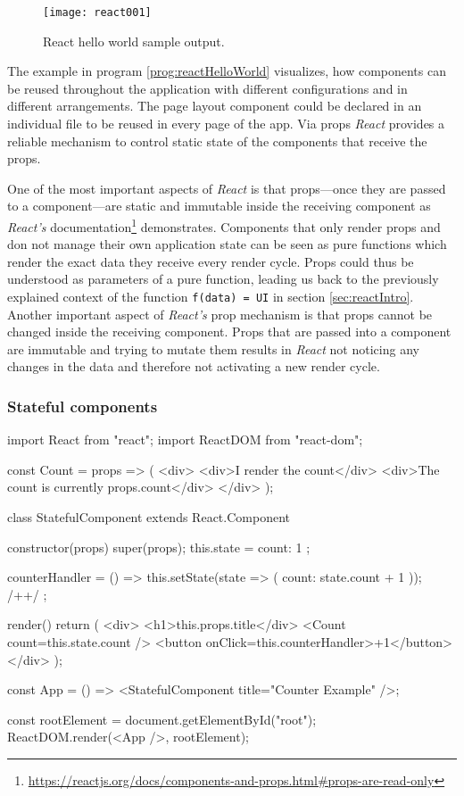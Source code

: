 \begin{figure}
  \centering
  \texttt{[image: react001]}
  \caption{React hello world sample output.}
  \label{fig:reactHelloWorld}
\end{figure}

The example in program \ref{prog:reactHelloWorld} visualizes, how components can be reused throughout the application with different configurations and in different arrangements. The page layout component could be declared in an individual file to be reused in every page of the app. Via props \emph{React} provides a reliable mechanism to control static state of the components that receive the props.

One of the most important aspects of \emph{React} is that props---once they are passed to a component---are static and immutable inside the receiving component as \emph{React's} documentation\footnote{\url{https://reactjs.org/docs/components-and-props.html\#props-are-read-only}} demonstrates. Components that only render props and don not manage their own application state can be seen as pure functions which render the exact data they receive every render cycle. Props could thus be understood as parameters of a pure function, leading us back to the previously explained context of the function \texttt{f(data) = UI} in section \ref{sec:reactIntro}. Another important aspect of \emph{React's} prop mechanism is that props cannot be changed inside the receiving component. Props that are passed into a component are immutable and trying to mutate them results in \emph{React} not noticing any changes in the data and therefore not activating a new render cycle.

\subsubsection{Stateful components}

\begin{program}
\caption{Simple example of a React component and its usage.} 
\label{prog:reactStateful}
\begin{JsCode}
import React from "react";
import ReactDOM from "react-dom";

const Count = props => (
  <div>
    <div>I render the count</div>
    <div>The count is currently {props.count}</div>
  </div>
);

class StatefulComponent extends React.Component {
  constructor(props) {
    super(props);
    this.state = {
      count: 1
    };
  }

  counterHandler = () => {
    this.setState(state => ({ count: state.count + 1 })); /+\label{line:setState}+/
  };

  render() {
    return (
      <div>
        <h1>{this.props.title}</div>
        <Count count={this.state.count} />
        <button onClick={this.counterHandler}>+1</button>
      </div>
    );
  }
}

const App = () => <StatefulComponent title={"Counter Example"} />;

const rootElement = document.getElementById("root");
ReactDOM.render(<App />, rootElement);
\end{JsCode}
\end{program}


